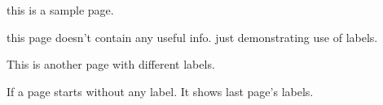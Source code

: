 \documentclass{article}
\begin{document}
this is a sample page.

this page doesn't contain any useful info.
just demonstrating use of labels.

\vfil
\break


This is another page with different labels.

\vfill
\break

If a page starts without any label. It shows last page's labels. 
\end{document}
